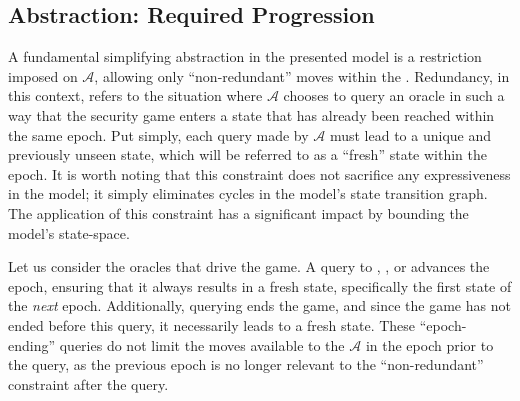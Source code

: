 \documentclass[runningheads]{llncs}
\newcommand{\Adversary}{\ensuremath{\mathcal{A}}\xspace}
\begin{document}

\subsection{Abstraction: Required Progression\label{sec:abstraction-progression}}

A fundamental simplifying abstraction in the presented model is a restriction imposed on \Adversary, allowing only ``non-redundant'' moves within the \CGKAsec.
Redundancy, in this context, refers to the situation where \Adversary chooses to query an oracle in such a way that the security game enters a state that has already been reached within the same epoch.
Put simply, each query made by \Adversary must lead to a unique and previously unseen state, which will be referred to as a ``fresh'' state within the epoch.
It is worth noting that this constraint does not sacrifice any expressiveness in the model; it simply eliminates cycles in the model's state transition graph.
The application of this constraint has a significant impact by bounding the model's state-space.

Let us consider the oracles that drive the game. A query to , , or  advances the epoch, ensuring that it always results in a fresh state, specifically the first state of the \emph{next} epoch.
Additionally, querying  ends the game, and since the game has not ended before this query, it necessarily leads to a fresh state.
These ``epoch-ending'' queries do not limit the moves available to the \Adversary in the epoch prior to the query, as the previous epoch is no longer relevant to the ``non-redundant'' constraint after the query.
\end{document}
